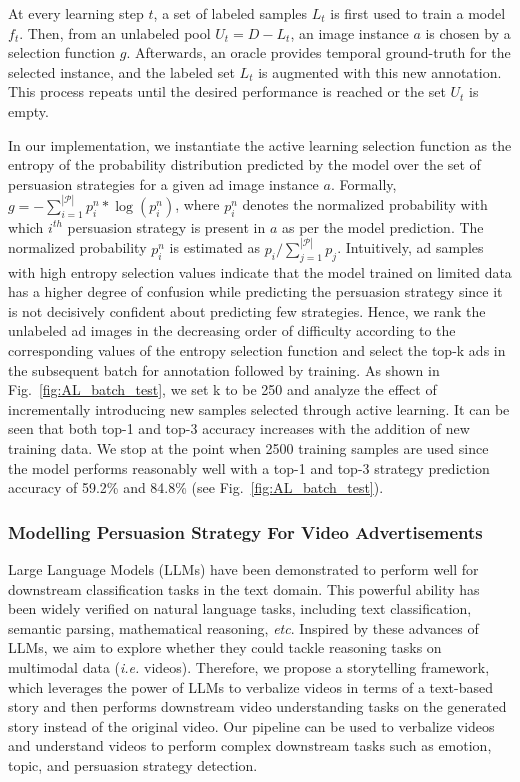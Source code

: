 At every learning step $t$, a set of labeled samples $L_t$ is first used to train a model
$f_t$. Then, from an unlabeled pool $U_t=D-L_t$, an image instance $a$ is chosen by a selection function $g$. Afterwards, an oracle provides temporal ground-truth for the selected instance, and the labeled set $L_t$ is augmented with this new annotation. This process repeats until the desired performance is reached or the set $U_t$ is empty.

In our implementation, we instantiate the active learning selection function as the entropy of the probability distribution predicted by the model over the set of persuasion strategies for a given ad image instance $a$. Formally, $g = -\sum_{i=1}^{|\mathcal{P}|}p^{n}_{i}*\log(p^{n}_i)$, where $p^{n}_i$ denotes the normalized probability with which $i^{th}$ persuasion strategy is present in $a$ as per the model prediction. The normalized probability $p^{n}_{i}$ is estimated as $p_i/\sum_{j=1}^{|\mathcal{P}|}p_j$. Intuitively, ad samples with high entropy selection values indicate that the model trained on limited data has a higher degree of confusion while predicting the persuasion strategy since it is not decisively confident about predicting few strategies. Hence, we rank the unlabeled ad images in the decreasing order of difficulty according to the corresponding values of the entropy selection function and select the top-k ads in the subsequent batch for annotation followed by training. As shown in Fig.~\ref{fig:AL_batch_test}, we set k to be 250 and analyze the effect of incrementally introducing new samples selected through active learning. It can be seen that both top-1 and top-3 accuracy increases with the addition of new training data. We stop at the point when 2500 training samples are used since the model performs reasonably well with a top-1 and top-3 strategy prediction accuracy of 59.2\% and 84.8\% (see Fig.~\ref{fig:AL_batch_test}). 






\subsubsection{Modelling Persuasion Strategy For Video Advertisements}
Large Language Models (LLMs) have been demonstrated to perform well for downstream classification tasks in the text domain. This powerful ability has been widely verified on natural language tasks, including text classification, semantic parsing, mathematical reasoning, \textit{etc}. Inspired by these advances of LLMs, we aim to explore whether they could tackle reasoning tasks on multimodal data (\textit{i.e.} videos). Therefore, we propose a storytelling framework, which leverages the power of LLMs to verbalize videos in terms of a text-based story and then performs downstream video understanding tasks on the generated story instead of the original video. Our pipeline can be used to verbalize videos and understand videos to perform complex downstream tasks such as emotion, topic, and persuasion strategy detection. 


